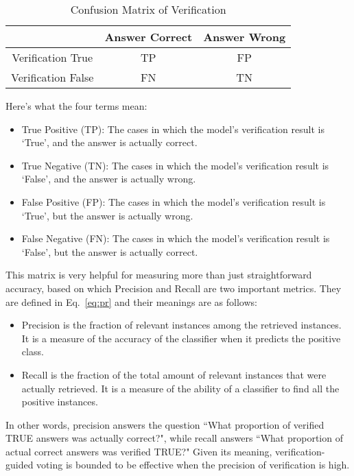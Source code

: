 \documentclass{article} \usepackage{iclr2023_conference,times}
\begin{document}
\begin{table}[ht]
\begin{center}
\caption{Confusion Matrix of Verification}
\label{tab:confision_matrix}
\begin{tabular}{c|cc}

\toprule
	& Answer Correct	& Answer Wrong\\
\midrule
Verification True	& TP & FP \\
Verification False & FN & TN \\
\bottomrule

\end{tabular}
\end{center}
\end{table}
Here's what the four terms mean:
\begin{itemize}
    \item True Positive (TP): The cases in which the model's verification result is ‘True', and the answer is actually correct.
    \item True Negative (TN): The cases in which the model's verification result is ‘False', and the answer is actually wrong.
    \item False Positive (FP): The cases in which the model's verification result is ‘True', but the answer is actually wrong.
    \item False Negative (FN): The cases in which the model's verification result is ‘False', but the answer is actually correct.
\end{itemize}

This matrix is very helpful for measuring more than just straightforward accuracy, based on which Precision and Recall are two important metrics. 
They are defined in Eq.~\ref{eq:pr} and their meanings are as follows: 
\begin{itemize}
\item Precision is the fraction of relevant instances among the retrieved instances. It is a measure of the accuracy of the classifier when it predicts the positive class.
\item Recall is the fraction of the total amount of relevant instances that were actually retrieved. It is a measure of the ability of a classifier to find all the positive instances.
\end{itemize}



In other words, precision answers the question “What proportion of verified TRUE answers was actually correct?", while recall answers “What proportion of actual correct answers was verified TRUE?"
Given its meaning, verification-guided voting is bounded to be effective when the precision of verification is high.
\end{document}
